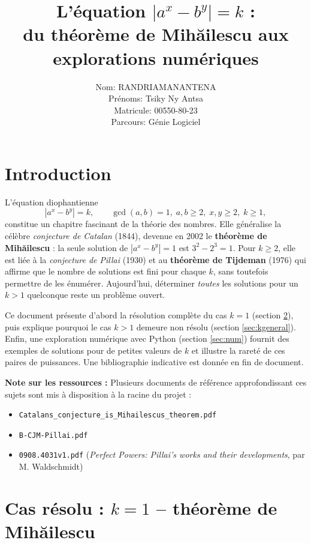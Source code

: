 \documentclass[12pt,a4paper]{article}
\title{L'équation \texorpdfstring{$|a^x - b^y| = k$}{|a^x - b^y| = k} :\\[2mm]
du théorème de Mihăilescu aux explorations numériques}
\author{Nom: RANDRIAMANANTENA \\
Prénoms: Tsiky Ny Antsa \\
Matricule: 00550-80-23 \\
Parcours: Génie Logiciel}
\date{}
\theoremstyle{plain}
\theoremstyle{definition}
\begin{document}
\maketitle

\section{Introduction}

L'équation diophantienne
\begin{equation}\label{eq:pillai}
|a^x - b^y| = k,\qquad \gcd(a,b)=1,\; a,b \ge 2,\; x,y \ge 2,\; k \ge 1,
\end{equation}
constitue un chapitre fascinant de la théorie des nombres. Elle généralise la célèbre \emph{conjecture de Catalan} (1844), devenue en 2002 le \textbf{théorème de Mihăilescu} : la seule solution de $|a^x - b^y| = 1$ est $3^2 - 2^3 = 1$. Pour $k \ge 2$, elle est liée à la \emph{conjecture de Pillai} (1930) et au \textbf{théorème de Tijdeman} (1976) qui affirme que le nombre de solutions est fini pour chaque $k$, sans toutefois permettre de les énumérer. Aujourd'hui, déterminer \emph{toutes} les solutions pour un $k>1$ quelconque reste un problème ouvert.

Ce document présente d'abord la résolution complète du cas $k=1$ (section \ref{sec:k1}), puis explique pourquoi le cas $k>1$ demeure non résolu (section \ref{sec:kgeneral}). Enfin, une exploration numérique avec Python (section \ref{sec:num}) fournit des exemples de solutions pour de petites valeurs de $k$ et illustre la rareté de ces paires de puissances. Une bibliographie indicative est donnée en fin de document.

\textbf{Note sur les ressources :} Plusieurs documents de référence approfondissant ces sujets sont mis à disposition à la racine du projet :
\begin{itemize}
    \item \texttt{Catalans\_conjecture\_is\_Mihailescus\_theorem.pdf}
    \item \texttt{B-CJM-Pillai.pdf}
    \item \texttt{0908.4031v1.pdf} (\emph{Perfect Powers: Pillai's works and their developments}, par M. Waldschmidt)
\end{itemize}

\section{Cas résolu : \texorpdfstring{$k=1$}{k=1} -- théorème de Mihăilescu}
\label{sec:k1}
\end{document}
